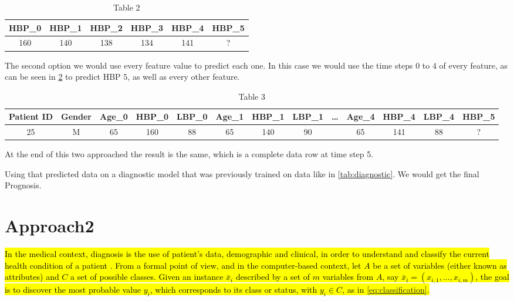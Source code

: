 \begin{table}[h]
\begin{center}
\begin{tabular}{cccccc}
\textbf{HBP\_0} & \textbf{HBP\_1} & \textbf{HBP\_2} & \textbf{HBP\_3} & \textbf{HBP\_4} & \textbf{HBP\_5} \\ \hline
160             & 140             & 138             & 134             & 141             & ?					\\ \hline        
\end{tabular}
\caption{Table 2}
\label{tab:approach1}
\end{center}
\end{table} 

The second option we would use every feature value to predict each one. In this case we would use the time steps $0$ to $4$ of every feature, as can be seen in \ref{tab:approach2} to predict
 HBP $5$, as well as every other feature.
 
 \begin{table}[h]
 \begin{center}
\begin{tabular}{ccccccccccccc}
\textbf{Patient ID} & \textbf{Gender} & \textbf{Age\_0} & \textbf{HBP\_0} & \textbf{LBP\_0} & \textbf{Age\_1} & \textbf{HBP\_1} & \textbf{LBP\_1} & \textbf{…} & \textbf{Age\_4} & \textbf{HBP\_4} & \textbf{LBP\_4} & \textbf{HBP\_5} \\ \hline
25                  & M               & 65              & 160             & 88              & 65              & 140             & 90              &            & 65              & 141             & 88              & ?              \\ \hline
\end{tabular}
\caption{Table 3}
\label{tab:approach2}
\end{center}
\end{table}

At the end of this two approached the result is the same, which is a complete data row at time step 5.

Using that predicted data on a diagnostic model that was previously trained on data like in \ref{tab:diagnostic}.
 We would get the final Prognosis.
\cleardoublepage
 
\chapter{Approach2}
\label{chapter:approach2}


\hl{In the medical context, diagnosis is the use of patient’s data, demographic and clinical, in order to understand 
and classify the current health condition of a patient \cite{Steyerberg2005}. From a formal point of view, and in the computer-based 
context, let $A$ be a set of variables (either known as attributes) and $C$ a set of possible classes. Given an instance
 $\bar{x}_i$ described by a set of $m$ variables from $A$, say $\bar{x}_i = (x_{i,1},... ,x_{i,m})$, the goal is to discover the most
 probable value $y_i$, which corresponds to its class or status, with $y_i \in C$, as in \ref{eq:classification}.}


